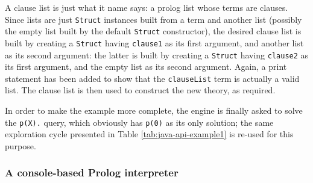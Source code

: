 A clause list is just what it name says: a prolog list whose terms are clauses. Since lists are just \texttt{Struct} instances built from a term and another list (possibly the empty list built by the default \texttt{Struct} constructor), the desired clause list is built by creating a \texttt{Struct} having \texttt{clause1} as its first argument, and another list as its second argument: the latter is built by creating a \texttt{Struct} having \texttt{clause2} as its first argument, and the empty list as its second argument. Again, a print statement has been added to show that the \texttt{clauseList} term is actually a valid list.
The clause list is then used to construct the new theory, as required.

In order to make the example more complete, the engine is finally asked to solve the \texttt{p(X).} query, which obviously has \texttt{p(0)} as its only solution; the same exploration cycle presented in Table \ref{tab:java-api-example1} is re-used for this purpose.

\subsubsection{A console-based Prolog interpreter}

